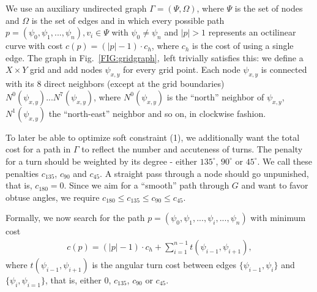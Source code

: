\documentclass{sig-alternate-sigmod09}
\begin{document}
We use an auxiliary undirected graph $\Gamma = (\Psi, \Omega)$, where $\Psi$ is the set of nodes and $\Omega$ is the set of edges and in which every possible path $p = (\psi_0, \psi_1, ..., \psi_n), v_i \in \Psi$ with $\psi_0 \neq \psi_n$ and $|p| > 1$ represents an octilinear curve with cost $c(p) = (|p| - 1) \cdot c_h$, where $c_h$ is the cost of using a single edge.
The graph in Fig.~\ref{FIG:gridgraph},~left trivially satisfies this: we define a $X\times Y$ grid and add nodes $\psi_{x,y}$ for every grid point.
Each node $\psi_{x,y}$ is connected with its 8 direct neighbors (except at the grid boundaries) $N^0(\psi_{x,y}) ... N^7(\psi_{x, y})$, where $N^0(\psi_{x, y})$ is the ``north'' neighbor of $\psi_{x, y}$,  $N^1(\psi_{x, y})$ the ``north-east'' neighbor and so on, in clockwise fashion.

To later be able to optimize soft constraint (1), we additionally want the total cost for a path in $\Gamma$ to reflect the number and accuteness of turns.
The penalty for a turn should be weighted by its degree - either $135^{\circ}$, $90^{\circ}$ or $45^{\circ}$.
We call these penalties $c_{135}$, $c_{90}$ and $c_{45}$.
A straight pass through a node should go unpunished, that is, $c_{180} = 0$.
Since we aim for a ``smooth'' path through $G$ and want to favor obtuse angles, we require $c_{180} \leq c_{135} \leq c_{90} \leq c_{45}$.

Formally, we now search for the path $p = (\psi_0, \psi_1, ..., \psi_i, ..., \psi_n)$ with minimum cost
\begin{align}
	c(p) = (|p| - 1) \cdot c_h + \sum_{i=1}^{n - 1} t(\psi_{i-1}, \psi_{i+1}),
\end{align}
where $t(\psi_{i-1}, \psi_{i+1})$ is the angular turn cost between edges $\{\psi_{i-1}, \psi_{i}\}$ and $\{\psi_{i}, \psi_{i=1}\}$, that is, either 0, $c_{135}$, $c_{90}$ or $c_{45}$.
\end{document}
